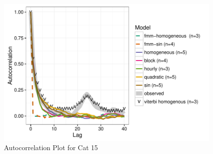 \documentclass{article}\usepackage[]{graphicx}\usepackage{xcolor}
\makeatletter
\def\maxwidth{ %
  \ifdim\Gin@nat@width>\linewidth
    \linewidth
  \else
    \Gin@nat@width
  \fi
}
\newenvironment{knitrout}{}{} %
\makeatother
\begin{document}
\begin{knitrout}
\color{fgcolor}\begin{figure}
\includegraphics[width=\maxwidth]{figure/acf_plot15-1} \caption[Autocorrelation Plot for Cat 15]{Autocorrelation Plot for Cat 15}\label{fig:acf_plot15}
\end{figure}


\end{knitrout}
\end{document}
